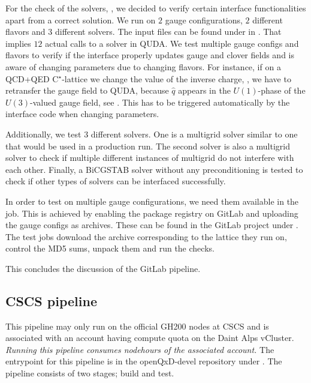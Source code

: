 For the check of the solvers, , we decided to verify certain interface functionalities apart from a correct solution. We run on $2$ gauge configurations, $2$ different flavors and $3$ different solvers. The input files can be found under  in \cite{gitlab:openqxd-devel}. That implies $12$ actual calls to a solver in QUDA. We test multiple gauge configs and flavors to verify if the interface properly updates gauge and clover fields and is aware of changing parameters due to changing flavors. For instance, if on a QCD+QED C$^{\star}$-lattice we change the value of the inverse charge, , we have to retransfer the gauge field to QUDA, because $\hat{q}$ appears in the $U(1)$-phase of the $U(3)$-valued gauge field, see . This has to be triggered automatically by the interface code when changing parameters.

Additionally, we test $3$ different solvers. One is a multigrid solver similar to one that would be used in a production run. The second solver is also a multigrid solver to check if multiple different instances of multigrid do not interfere with each other. Finally, a BiCGSTAB solver without any preconditioning is tested to check if other types of solvers can be interfaced successfully.

In order to test on multiple gauge configurations, we need them available in the job. This is achieved by enabling the package registry on GitLab and uploading the gauge configs as  archives. These can be found in the GitLab project under . The test jobs download the archive corresponding to the lattice they run on, control the MD5 sums, unpack them and run the checks.

This concludes the discussion of the GitLab pipeline.

\subsection{CSCS pipeline}
\label{sec:cicd:pipeline:cscs}

This pipeline may only run on the official GH200 nodes at CSCS and is associated with an account having compute quota on the Daint Alps vCluster. \emph{Running this pipeline consumes nodehours of the associated account.} The entrypoint for this pipeline is in the openQxD-devel repository\cite{gitlab:openqxd-devel} under . The pipeline consists of two stages; build and test.

